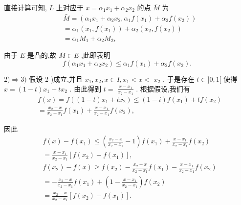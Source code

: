 直接计算可知, $L$ 上对应于 $x = {\alpha }_{1}{x}_{1} + {\alpha }_{2}{x}_{2}$ 的点 $\bar{M}$ 为
\begin{align*}
	&\bar{M} = \left( {{\alpha }_{1}{x}_{1} + {\alpha }_{2}{x}_{2},{\alpha }_{1}f\left( {x}_{1}\right)  + {\alpha }_{2}f\left( {x}_{2}\right) }\right)\\
	&= {\alpha }_{1}\left( {{x}_{1},f\left( {x}_{1}\right) }\right)  + {\alpha }_{2}\left( {{x}_{2},f\left( {x}_{2}\right) }\right)\\
	&= {\alpha }_{1}{M}_{1} + {\alpha }_{2}{M}_{2},
\end{align*}

由于 $E$ 是凸的,故 $\bar{M} \in  E$ ,此即表明
$$f\left( {{\alpha }_{1}{x}_{1} + {\alpha }_{2}{x}_{2}}\right)  \leq  {\alpha }_{1}f\left( {x}_{1}\right)  + {\alpha }_{2}f\left( {x}_{2}\right) .$$

$2) \Rightarrow  3)$ 假设 2 )成立,并且 ${x}_{1},{x}_{2},x \in  I,{x}_{1} < x <$  ${x}_{2}$ . 于是存在 $t \in  \rbrack 0,1\lbrack$ 使得 $x = \left( {1 - t}\right) {x}_{1} + t{x}_{2}$ . 由此得到 $t =$  $\frac{x - {x}_{1}}{{x}_{2} - {x}_{1}}$ . 根据假设,我们有
\begin{align*}
	&f\left( x\right)  = f\left( {\left( {1 - t}\right) {x}_{1} + t{x}_{2}}\right)  \leq  \left( {1 - i}\right) f\left( {x}_{1}\right)  + {tf}\left( {x}_{2}\right)\\
	&= \frac{{x}_{2} - x}{{x}_{2} - {x}_{1}}f\left( {x}_{1}\right)  + \frac{x - {x}_{1}}{{x}_{2} - {x}_{1}}f\left( {x}_{2}\right) ,
\end{align*}

因此
\begin{align*}
	&f\left( x\right)  - f\left( {x}_{1}\right)  \leq  \left( {\frac{{x}_{2} - x}{{x}_{2} - {x}_{1}} - 1}\right) f\left( {x}_{1}\right)  + \frac{x - {x}_{1}}{{x}_{2} - {x}_{1}}f\left( {x}_{2}\right)\\
	&= \frac{x - {x}_{1}}{{x}_{2} - {x}_{1}}\left\lbrack  {f\left( {x}_{2}\right)  - f\left( {x}_{1}\right) }\right\rbrack  ,\\
	&f\left( {x}_{2}\right)  - f\left( x\right)  \geq  f\left( {x}_{2}\right)  - \frac{{x}_{2} - x}{{x}_{2} - {x}_{1}}f\left( {x}_{1}\right)  - \frac{x - {x}_{1}}{{x}_{2} - {x}_{1}}f\left( {x}_{2}\right)\\
	&=  - \frac{{x}_{2} - x}{{x}_{2} - {x}_{1}}f\left( {x}_{1}\right)  + \left( {1 - \frac{x - {x}_{1}}{{x}_{2} - {x}_{1}}}\right) f\left( {x}_{2}\right)\\
	&= \frac{{x}_{2} - x}{{x}_{2} - {x}_{1}}\left\lbrack  {f\left( {x}_{2}\right)  - f\left( {x}_{1}\right) }\right\rbrack  .
\end{align*}

